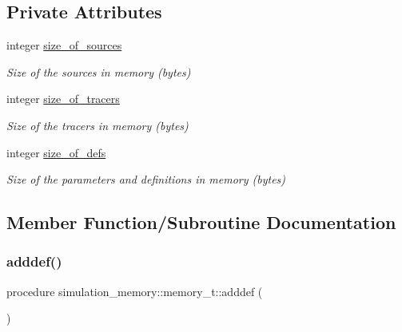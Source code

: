 \subsection*{Private Attributes}
\begin{DoxyCompactItemize}
\item 
integer \mbox{\hyperlink{structsimulation__memory_1_1memory__t_ad912536f320cd23924d860c4b6810f8a}{size\+\_\+of\+\_\+sources}}
\begin{DoxyCompactList}\small\item\em Size of the sources in memory (bytes) \end{DoxyCompactList}\item 
integer \mbox{\hyperlink{structsimulation__memory_1_1memory__t_aa8a0070dcb1efa0b14a86d40fee9e03d}{size\+\_\+of\+\_\+tracers}}
\begin{DoxyCompactList}\small\item\em Size of the tracers in memory (bytes) \end{DoxyCompactList}\item 
integer \mbox{\hyperlink{structsimulation__memory_1_1memory__t_adba405ad7926a890f3e4feaa9c0cf904}{size\+\_\+of\+\_\+defs}}
\begin{DoxyCompactList}\small\item\em Size of the parameters and definitions in memory (bytes) \end{DoxyCompactList}\end{DoxyCompactItemize}


\subsection{Member Function/\+Subroutine Documentation}
\mbox{\label{structsimulation__memory_1_1memory__t_a5a231dfd0c9f39ad6c949519ad168f70}} 
\subsubsection{\texorpdfstring{adddef()}{adddef()}}
{\footnotesize\ttfamily procedure simulation\+\_\+memory\+::memory\+\_\+t\+::adddef (\begin{DoxyParamCaption}{ }\end{DoxyParamCaption})\hspace{0.3cm}{\ttfamily [private]}}

